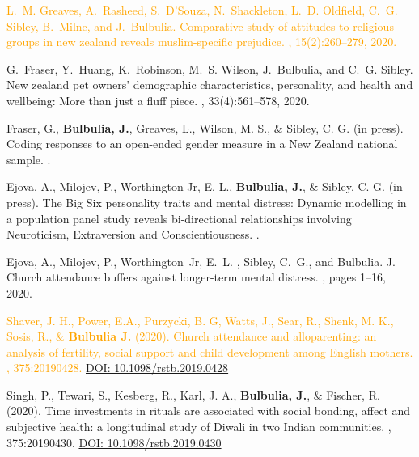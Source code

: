 \documentclass{article}
\begin{document}
\begin{thebibliography}{99}
\textcolor{Orange}{L.~M. Greaves, A.~Rasheed, S.~D'Souza, N.~Shackleton, L.~D. Oldfield, C.~G.
  Sibley, B.~Milne, and J.~Bulbulia.
\newblock Comparative study of attitudes to religious groups in new zealand
  reveals muslim-specific prejudice.
,
  15(2):260--279, 2020.}



G.~Fraser, Y.~Huang, K.~Robinson, M.~S. Wilson, J.~Bulbulia, and C.~G. Sibley.
\newblock New zealand pet owners' demographic characteristics, personality, and
  health and wellbeing: More than just a fluff piece.
, 33(4):561--578, 2020.


 Fraser, G., {\bf Bulbulia, J.}, Greaves, L., Wilson, M. S., \& Sibley, C. G. (in press). 
\newblock Coding responses to an open-ended gender measure in a New Zealand national sample.
. 


 Ejova, A., Milojev, P., Worthington Jr, E. L., {\bf Bulbulia, J.}, \& Sibley, C. G. (in press). 
\newblock The Big Six personality traits and mental distress: Dynamic modelling in a population panel study reveals bi-directional relationships involving Neuroticism, Extraversion and Conscientiousness.
. 

 Ejova, A., Milojev, P., Worthington~Jr, E.~L. , Sibley, C.~G., and {\bf }Bulbulia. J.
\newblock Church attendance buffers against longer-term mental distress.
, pages 1--16, 2020.


 \textcolor{Orange}{Shaver, J. H., Power, E.A., Purzycki, B. G, Watts, J., Sear, R., Shenk, M. K., Sosis, R., \& {\bf Bulbulia J.} (2020). 
\newblock Church attendance and alloparenting: an analysis of fertility, social support and child development among English mothers. 
, 375:20190428.
\href{http://dx.doi.org/10.1098/rstb.2019.0428}{DOI: 10.1098/rstb.2019.0428}}


 Singh, P., Tewari, S., Kesberg, R., Karl, J. A., {\bf Bulbulia, J.}, \& Fischer, R. (2020). 
\newblock Time investments in rituals are associated with social bonding, affect and subjective health: a longitudinal study of Diwali in two Indian communities. 
, 375:20190430.
\href{http://dx.doi.org/10.1098/rstb.2019.0430}{DOI: 10.1098/rstb.2019.0430}



\end{thebibliography}
\end{document}
